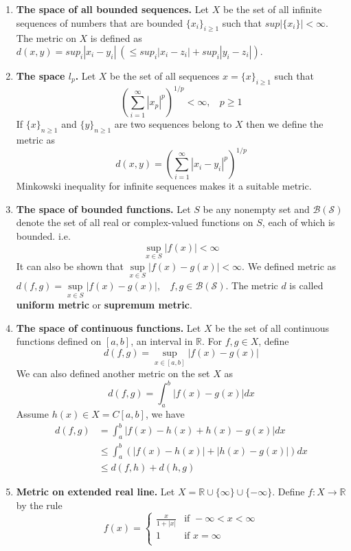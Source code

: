\documentclass[12pt]{report}
\begin{document}
\begin{enumerate}
    \item \textbf{The space of all bounded sequences.} Let $X$ be the set of all infinite sequences of numbers that are bounded $\{x_i\}_{i \geq 1}$ such that $sup|\{x_i\}| < \infty$. The metric on $X$ is defined as $d(x,y)= sup_i|x_i - y_i| ~(\leq sup_i|x_i - z_i| + sup_i|y_i - z_i|).$
    \item \textbf{The space $l_p$.} Let $X$ be the set of all sequences $x = \{x\}_{i \geq 1}$ such that 
    $$ \left(\sum\limits_{i = 1}^{\infty} |x_p|^p\right)^{1/p} < \infty,~~~~p \geq 1$$
    If $\{x\}_{n \geq 1}$ and $\{y\}_{n \geq 1}$ are two sequences belong to $X$ then we define the metric as
    $$ d(x,y) = \left(\sum\limits_{i = 1}^{\infty} |x_i - y_i|^p\right)^{1/p}$$
    Minkowski inequality for infinite sequences makes it a suitable metric.
    \item \textbf{The space of bounded functions.} Let $S$ be any nonempty set and $\mathcal{B(S)}$ denote the set of all real or complex-valued functions on $S$, each of which is bounded. i.e. 
    $$ \sup\limits_{x \in S} |f(x)| < \infty$$
    It can also be shown that $\sup\limits_{x \in S} |f(x) - g(x)| < \infty$. We defined metric as $d(f,g) = \sup\limits_{x \in S}|f(x) - g(x)|,~~~~ f,g \in \mathcal{B(S)}$. The metric $d$ is called \textbf{uniform metric} or \textbf{supremum metric}.
    \item \textbf{The space of continuous functions.} Let $X$ be the set of all continuous functions defined on $[a,b]$, an interval in $\mathbb{R}$. For $f,g \in X$, define
    $$ d(f,g) = \sup\limits_{x\in [a,b]} |f(x) - g(x)|$$
    We can also defined another metric on the set $X$ as
    $$ d(f,g) = \int_a^b |f(x) - g(x)| dx$$
    Assume $h(x) \in X = C[a,b]$, we have
    \begin{align*}
        d(f,g) &= \int_a^b |f(x) - h(x) + h(x) - g(x)| dx\\
        &\leq \int_a^b \left(|f(x) - h(x)| + |h(x) - g(x)| \right)dx\\
        &\leq d(f,h) + d(h,g)
    \end{align*}
    \item \textbf{Metric on extended real line.} Let $X = \mathbb{R} \cup \{\infty\} \cup \{-\infty\}$. Define $f: X \to \mathbb{R}$ by the rule
    $$ f(x) = \begin{cases}
        \frac{x}{1+|x|} & \text{if } -\infty < x < \infty \\
        1 & \text{if } x = \infty\\

\end{cases}$$
\end{enumerate}
\end{document}
